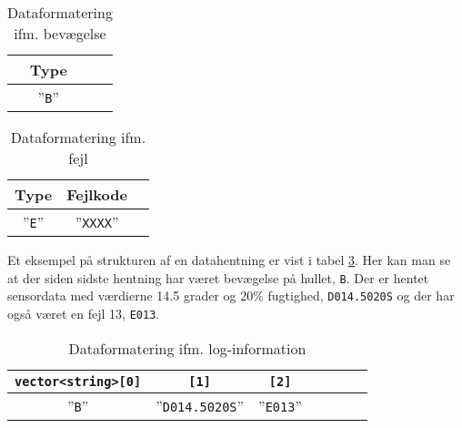 \begin{table}[h]
	\caption{Dataformatering ifm. bevægelse}
	\centering
	\begin{tabular}{|c|c|}
		\hline 
		\textbf{Type} \\ 
		\hline 
		''\verb+B+'' \\ 
		\hline 
	\end{tabular} 
	\label{table:SWDataprotokol-bevaegelse}
\end{table}

\begin{table}[h]
	\caption{Dataformatering ifm. fejl}
	\centering
	\begin{tabular}{|c|c|c|}
		\hline 
		\textbf{Type} & \textbf{Fejlkode} \\ 
		\hline 
		''\verb+E+'' & ''\verb+XXXX+'' \\ 
		\hline 
	\end{tabular} 
	\label{table:SWDataprotokol-error}
\end{table}

Et eksempel på strukturen af en datahentning er vist i tabel \ref{table:SWDataprotokol-eksempel}. Her kan man se at der siden sidste hentning har været bevægelse på hullet, \verb+B+. Der er hentet sensordata med værdierne 14.5 grader og 20\% fugtighed, \verb+D014.5020S+ og der har også været en fejl 13, \verb+E013+.

\begin{table}[h]
	\caption{Dataformatering ifm. log-information}
	\centering
	\begin{tabular}{|c|c|c|c|c|c|c|}
		\hline
		\verb+vector<string>[0]+ & \verb+[1]+ & \verb+[2]+ \\
		\hline 
		''\verb+B+'' & ''\verb+D014.5020S+'' & ''\verb+E013+'' \\ 
		\hline 
	\end{tabular} 
	\label{table:SWDataprotokol-eksempel}
\end{table}